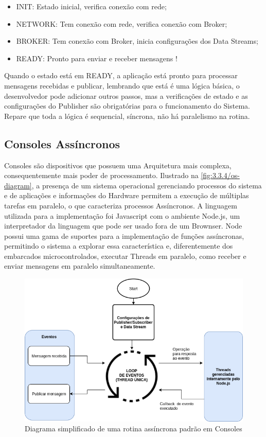 \begin{itemize}
\item INIT: Estado inicial, verifica conexão com rede;
\item NETWORK: Tem conexão com rede, verifica conexão com Broker;
\item BROKER: Tem conexão com Broker, inicia configurações dos Data Streams;
\item READY: Pronto para enviar e receber mensagens !
\end{itemize}

Quando o estado está em READY, a aplicação está pronto para processar mensagens recebidas e publicar, lembrando que está é uma lógica básica, o desenvolvedor pode adicionar outros passos, mas a verificações de estado e as configurações do Publisher são obrigatórias para o funcionamento do Sistema. Repare que toda a lógica é sequencial, síncrona, não há paralelismo na rotina.

\subsection{Consoles Assíncronos}
\label{subsection:consoles_assinc}

Consoles são dispositivos que possuem uma Arquitetura mais complexa, consequentemente mais poder de processamento. Ilustrado na  \ref{fig:3.3.4/os-diagram}, a presença de um sistema operacional gerenciando processos do sistema e de aplicações e informações do Hardware permitem a execução de múltiplas tarefas em paralelo, o que caracteriza processos Assíncronos. A linguagem utilizada para a implementação foi Javascript com o ambiente Node.js, um interpretador da linguagem que pode ser usado fora de um Brownser. Node possui uma gama de suportes para a implementação de funções assíncronas, permitindo o sistema a explorar essa característica e, diferentemente dos embarcados microcontrolados, executar Threads em paralelo, como receber e enviar mensagens em paralelo simultaneamente.


\begin{figure}[h!]
\centering
\includegraphics[width=13cm]{./02_Capitulos/02_Cap3/figures/async-implementation}
\caption{Diagrama simplificado de uma rotina assíncrona padrão em Consoles}
\label{fig:async-implementation}
\end{figure}

